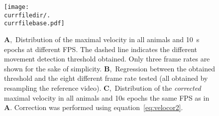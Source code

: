 \begin{figure}[h!]
  \centering   
  		\begin{minipage}[t]{0.5\textwidth}
  	\vspace{0pt}
  	\texttt{[image: \\currfiledir/.\\currfilebase.pdf]}
  \end{minipage}\hfill
  \begin{minipage}[t]{0.45\textwidth}
  \caption[Velocity correction]{
  	\textbf{A},~Distribution of the maximal velocity in all animals and 10~s epochs at different FPS.
  	The dashed line indicates the different movement detection threshold obtained.
  	Only three frame rates are shown for the sake of simplicity.
	\textbf{B},~Regression between the obtained threshold and the eight different frame rate tested (all obtained by resampling the reference video).
	\textbf{C},~Distribution of the \emph{corrected} maximal velocity in all animals and 10s epochs the same FPS as in \textbf{A}.
	Correction was performed using equation~\ref{eq:velocor2}.
  \label{fig:\currfilebase}
  }
  \end{minipage}
\end{figure}





